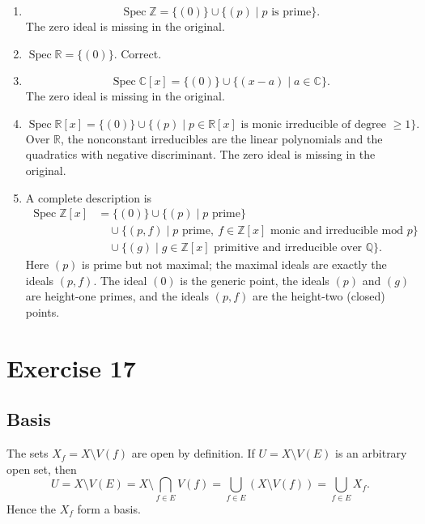 \documentclass[11pt]{article}
\DeclareMathOperator{\Spec}{Spec}
\begin{document}
\begin{enumerate}[label=(\roman*)]
  \item
        \[
        \Spec\mathbb Z=\{(0)\}\cup\{(p)\mid p\text{ is prime}\}.
        \]
        The zero ideal is missing in the original.

  \item \(\Spec\mathbb R=\{(0)\}\).  Correct.

  \item
        \[
        \Spec\mathbb C[x]=\{(0)\}\cup\{(x-a)\mid a\in\mathbb C\}.
        \]
        The zero ideal is missing in the original.

  \item
        \[
        \Spec\mathbb R[x]=\{(0)\}\cup\{(p)\mid p\in\mathbb R[x]
        \text{ is monic irreducible of degree }\ge1\}.
        \]
        Over \(\mathbb R\), the nonconstant irreducibles are the linear
        polynomials and the quadratics with negative discriminant.  The zero
        ideal is missing in the original.

  \item A complete description is
        \[
        \begin{aligned}
        \Spec\mathbb Z[x]
        &=\{(0)\}
        \cup\{(p)\mid p\text{ prime}\}\\
        &\quad\cup\{(p,f)\mid p\text{ prime},\ f\in\mathbb Z[x]\text{ monic and
        irreducible mod }p\}\\
        &\quad\cup\{(g)\mid g\in\mathbb Z[x]\text{ primitive and irreducible
        over }\mathbb Q\}.
        \end{aligned}
        \]
        Here \((p)\) is prime but not maximal; the maximal ideals are exactly
        the ideals \((p,f)\).  The ideal \((0)\) is the generic point, the
        ideals \((p)\) and \((g)\) are height-one primes, and the
        ideals \((p,f)\) are the height-two (closed) points.
\end{enumerate}

\section*{Exercise 17}

\subsection*{Basis}
The sets \(X_f=X\setminus V(f)\) are open by definition.  If
\(U=X\setminus V(E)\) is an arbitrary open set, then
\[
U=X\setminus V(E)=X\setminus\bigcap_{f\in E}V(f)
=\bigcup_{f\in E}(X\setminus V(f))
=\bigcup_{f\in E}X_f.
\]
Hence the \(X_f\) form a basis.
\end{document}
